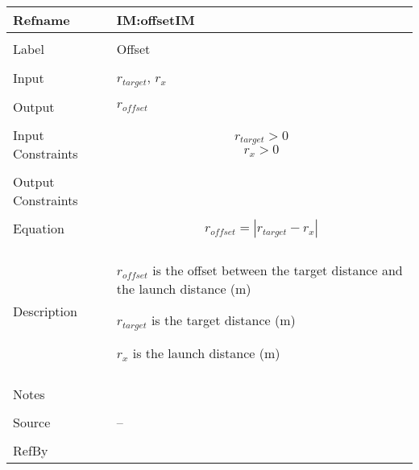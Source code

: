 \documentclass[12pt]{article}
\begin{document}
\noindent \begin{minipage}{\textwidth}
\begin{tabular}{p{} p{}}
\toprule \textbf{Refname} & \textbf{IM:offsetIM}
\label{IM:offsetIM}
\\ \midrule \\
Label & Offset
\\ \midrule \\
Input & ${r_{target}}$, ${r_{x}}$
\\ \midrule \\
Output & ${r_{offset}}$
\\ \midrule \\
Input Constraints & \begin{displaymath}
                    {r_{target}}>0
                    \end{displaymath}
                    \begin{displaymath}
                    {r_{x}}>0
                    \end{displaymath}
\\ \midrule \\
Output Constraints & 
\\ \midrule \\
Equation & \begin{displaymath}
           {r_{offset}}=|{r_{target}}-{r_{x}}|
           \end{displaymath}
\\ \midrule \\
Description & \begin{symbDescription}
              \item{${r_{offset}}$ is the offset between the target distance and the launch distance (m)}
              \item{${r_{target}}$ is the target distance (m)}
              \item{${r_{x}}$ is the launch distance (m)}
              \end{symbDescription}
\\ \midrule \\
Notes & 
\\ \midrule \\
Source & --
\\ \midrule \\
RefBy & 
\\ \bottomrule \end{tabular}
\end{minipage}
\par~
\end{document}
